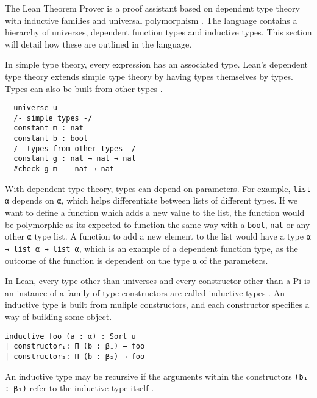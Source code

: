 The Lean Theorem Prover is a proof assistant based on dependent type theory with inductive families and universal polymorphism \cite{inductive_families}. The language contains a hierarchy of universes, dependent function types and inductive types. This section will detail how these are outlined in the language.

In simple type theory, every expression has an associated type. Lean's dependent type theory extends simple type theory by having types themselves by types. Types can also be built from other types \cite{lean:manual}.  

\begin{lstlisting}
  universe u
  /- simple types -/
  constant m : nat
  constant b : bool
  /- types from other types -/
  constant g : nat → nat → nat
  #check g m -- nat → nat
\end{lstlisting}

With dependent type theory, types can depend on parameters. For example, \lstinline{list α} depends on \lstinline{α}, which helps differentiate between lists of different types. If we want to define a function which adds a new value to the list, the function would be polymorphic as its expected to function the same way with a \lstinline{bool}, \lstinline{nat} or any other \lstinline{α} type list. A function to add a new element to the list would have a type \lstinline{α → list α → list α}, which is an example of a dependent function type, as the outcome of the function is dependent on the type \lstinline{α} of the parameters.

In Lean, every type other than universes and every constructor other than a Pi is an instance of a family of type constructors are called inductive types \cite{lean:manual}. An inductive type is built from muliple constructors, and each constructor specifies a way of building some object. 

\begin{lstlisting}
inductive foo (a : α) : Sort u
| constructor₁: Π (b : β₁) → foo
| constructor₂: Π (b : β₂) → foo
\end{lstlisting}

An inductive type may be recursive if the arguments within the constructors \lstinline{(b₁ : β₁)} refer to the inductive type itself \cite{lean:reference}.
